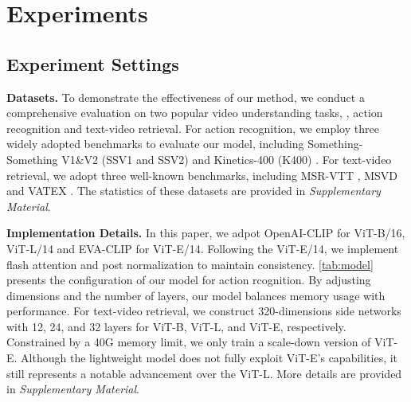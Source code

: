 \documentclass[10pt,twocolumn,letterpaper]{article}
\begin{document}
 \section{Experiments}

\subsection{Experiment Settings}

\noindent\textbf{Datasets.} To demonstrate the effectiveness of our method, we conduct a comprehensive evaluation on two popular video understanding tasks, \ie, action recognition and text-video retrieval.
For action recognition, we employ three widely adopted benchmarks to evaluate our model, including Something-Something V1\&V2 (SSV1 and SSV2) \cite{something} and Kinetics-400 (K400) \cite{kinetics}. 
For text-video retrieval, we adopt three well-known benchmarks, including MSR-VTT \cite{msrvtt}, MSVD \cite{msvd} and VATEX \cite{vatex}.
The statistics of these datasets are provided in \emph{Supplementary Material}.




\noindent\textbf{Implementation Details.}
In this paper, we adpot OpenAI-CLIP \cite{clip} for ViT-B/16, ViT-L/14 and EVA-CLIP \cite{eva} for ViT-E/14. Following the ViT-E/14, we implement flash attention \cite{flashattention} and post normalization to maintain consistency. \cref{tab:model} presents the configuration of our model for action rcognition. By adjusting dimensions and the number of layers, our model balances memory usage with performance. For text-video retrieval, we construct 320-dimensions side networks with 12, 24, and 32 layers for ViT-B, ViT-L, and ViT-E, respectively. 
Constrained by a 40G memory limit, we only train a scale-down version of ViT-E. Although the lightweight model does not fully exploit ViT-E's capabilities, it still represents a notable advancement over the ViT-L. More details are provided in \emph{Supplementary Material}.
\end{document}
